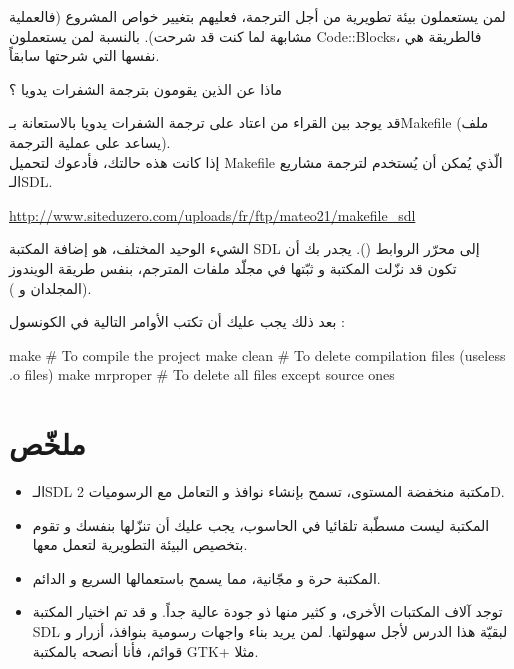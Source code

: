 لمن يستعملون بيئة تطويرية من أجل الترجمة، فعليهم بتغيير خواص المشروع (فالعملية مشابهة لما كنت قد شرحت). بالنسبة لمن يستعملون 
\textenglish{Code::Blocks}،
فالطريقة هي نفسها التي شرحتها سابقاً.

\begin{question}
 ماذا عن الذين يقومون بترجمة الشفرات يدويا ؟
\end{question}

قد يوجد بين القراء من اعتاد على ترجمة الشفرات يدويا بالاستعانة بـ\textenglish{Makefile}
(ملف يساعد على عملية الترجمة).\\
إذا كانت هذه حالتك، فأدعوك لتحميل
\textenglish{Makefile}
الّذي يُمكن أن يُستخدم لترجمة مشاريع الـ\textenglish{SDL}.

\url{http://www.siteduzero.com/uploads/fr/ftp/mateo21/makefile_sdl}

الشيء الوحيد المختلف، هو إضافة المكتبة
\textenglish{SDL}
إلى محرّر الروابط
().
يجدر بك أن تكون قد نزّلت المكتبة و ثبّتها في مجلّد ملفات المترجم، بنفس طريقة الويندوز (المجلدان
و 
).

بعد ذلك يجب عليك أن تكتب الأوامر التالية في الكونسول :

\begin{Console}
make      	# To compile the project
make clean	# To delete compilation files (useless .o files)
make mrproper # To delete all files except source ones
\end{Console}

\section*{ملخّص}

\begin{itemize}
	\item الـ\textenglish{SDL}
	مكتبة منخفضة المستوى، تسمح بإنشاء نوافذ و التعامل مع الرسوميات
	\textenglish{2D}.
	\item المكتبة ليست مسطّبة تلقائيا في الحاسوب، يجب عليك أن تنزّلها بنفسك و تقوم بتخصيص البيئة التطويرية لتعمل معها.
	\item المكتبة حرة و مجّانية، مما يسمح باستعمالها السريع و الدائم.
	\item توجد آلاف المكتبات الأخرى، و كثير منها ذو جودة عالية جداً. و قد تم اختيار المكتبة 
	\textenglish{SDL}
	لبقيّة هذا الدرس لأجل سهولتها. لمن يريد بناء واجهات رسومية بنوافذ، أزرار و قوائم، فأنا أنصحه بالمكتبة 
	\textenglish{GTK+}
	مثلا.
\end{itemize}
